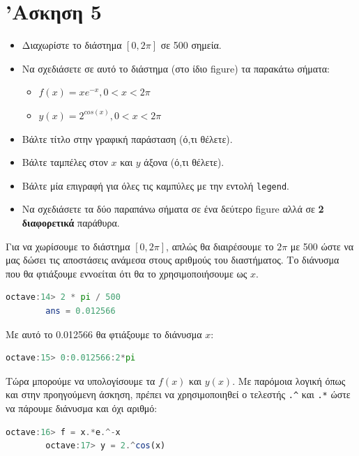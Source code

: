 \documentclass{article}
\begin{document}
\section{'Ασκηση 5}

\begin{itemize}
        \item Διαχωρίστε το διάστημα $[0, 2\pi]$ σε 500 σημεία.
        \item Να σχεδιάσετε σε αυτό το διάστημα (στο ίδιο figure)
                τα παρακάτω σήματα:
        \begin{itemize}
                \item $f(x) = xe^{-x}, 0 < x < 2\pi$
                \item $y(x) = 2^{cos(x)}, 0 < x < 2\pi$
        \end{itemize}
        \item Βάλτε τίτλο στην γραφική παράσταση (ό,τι θέλετε).
        \item Βάλτε ταμπέλες στον $x$ και $y$ άξονα (ό,τι θέλετε).
        \item Βάλτε μία επιγραφή για όλες τις καμπύλες με την εντολή
                \lstinline{legend}.
        \item Να σχεδιάσετε τα δύο παραπάνω σήματα σε ένα δεύτερο figure
                αλλά σε \textbf{2 διαφορετικά} παράθυρα.
\end{itemize}

Για να χωρίσουμε το διάστημα $[0,2\pi]$, απλώς θα διαιρέσουμε το $2\pi$ με
500 ώστε να μας δώσει τις αποστάσεις ανάμεσα στους αριθμούς του διαστήματος.
Το διάνυσμα που θα φτιάξουμε εννοείται ότι θα το χρησιμοποιήσουμε ως $x$.

\begin{lstlisting}[language=octave]
        octave:14> 2 * pi / 500
        ans = 0.012566
\end{lstlisting}

Με αυτό το 0.012566 θα φτιάξουμε το διάνυσμα $x$:

\begin{lstlisting}[language=octave]
        octave:15> 0:0.012566:2*pi
\end{lstlisting}

Τώρα μπορούμε να υπολογίσουμε τα $f(x)$ και $y(x)$. Με παρόμοια λογική όπως
και στην προηγούμενη άσκηση, πρέπει να χρησιμοποιηθεί ο τελεστής \lstinline{.^}
και \lstinline{.*} ώστε να πάρουμε διάνυσμα και όχι αριθμό:

\begin{lstlisting}[language=octave]
        octave:16> f = x.*e.^-x
        octave:17> y = 2.^cos(x)
\end{lstlisting}
\end{document}
